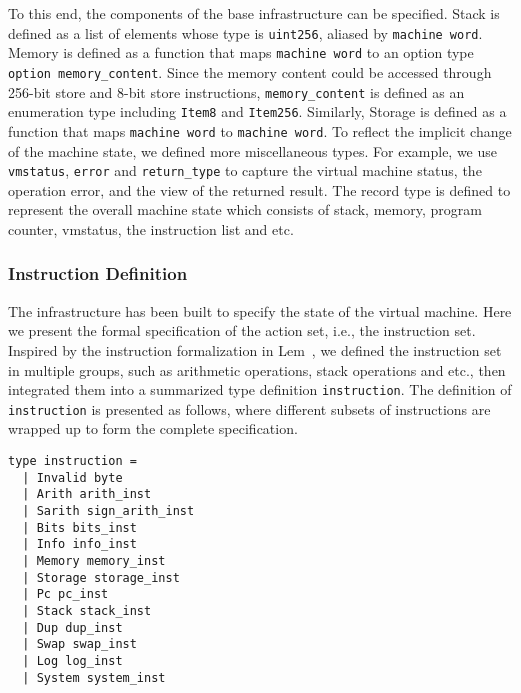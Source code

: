 \documentclass[runningheads]{llncs}
\begin{document}
To this end, the components of the base infrastructure can be specified. Stack is defined as a list of elements whose type is \texttt{uint256}, aliased by \texttt{machine word}. Memory is defined as a function that maps \texttt{machine word} to an option type \texttt{option memory\_content}. Since the memory content could be accessed through 256-bit store and 8-bit store instructions, \texttt{memory\_content} is defined as an enumeration type including \texttt{Item8} and \texttt{Item256}. Similarly, Storage is defined as a function that maps \texttt{machine word} to \texttt{machine word}. To reflect the implicit change of the machine state, we defined more miscellaneous types. For example, we use \texttt{vmstatus}, \texttt{error} and \texttt{return\_type} to capture the virtual machine status, the operation error, and the view of the returned result. The record type  is defined to represent the overall machine state which consists of stack, memory, program counter, vmstatus, the instruction list and etc.

\subsubsection{Instruction Definition}\label{sec:instruction}
The infrastructure has been built to specify the state of the virtual machine. Here we present the formal specification of the action set, i.e., the instruction set. Inspired by the instruction formalization in Lem~\cite{hirai2017defining}, we defined the instruction set in multiple groups, such as arithmetic operations, stack operations and etc., then integrated them into a summarized type definition \texttt{instruction}. The definition of \texttt{instruction} is presented as follows, where different subsets of instructions are wrapped up to form the complete specification.
\begin{verbatim}
type instruction =
  | Invalid byte
  | Arith arith_inst  
  | Sarith sign_arith_inst
  | Bits bits_inst
  | Info info_inst
  | Memory memory_inst
  | Storage storage_inst
  | Pc pc_inst
  | Stack stack_inst
  | Dup dup_inst
  | Swap swap_inst
  | Log log_inst
  | System system_inst
\end{verbatim}
\end{document}
